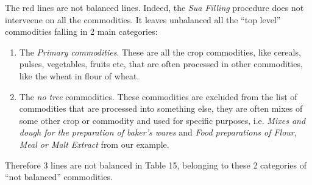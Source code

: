 \documentclass[]{article}
\providecommand{\tightlist}{%
  \setlength{\itemsep}{0pt}\setlength{\parskip}{0pt}}
\begin{document}
The red lines are not balanced lines. Indeed, the \emph{Sua Filling}
procedure does not interveene on all the commodities. It leaves
unbalanced all the ``top level'' commodities falling in 2 main
categories:

\begin{enumerate}
\def\labelenumi{\arabic{enumi}.}
\tightlist
\item
  The \emph{Primary commodities}. These are all the crop commodities,
  like cereals, pulses, vegetables, fruits etc, that are often processed
  in other commodities, like the wheat in flour of wheat.
\item
  The \emph{no tree} commodities. These commodities are excluded from
  the list of commodities that are processed into something else, they
  are often mixes of some other crop or commodity and used for specific
  purposes, i.e. \emph{Mixes and dough for the preparation of baker's
  wares} and \emph{Food preparations of Flour, Meal or Malt Extract}
  from our example.
\end{enumerate}

Therefore 3 lines are not balanced in Table 15, belonging to these 2
categories of ``not balanced'' commodities.
\end{document}
